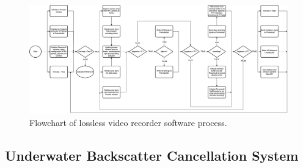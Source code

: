\pagebreak
\begin{landscape}
    \begin{figure}
        \centering
        \includegraphics[width=1\linewidth]{assets/impl_rec-flow.png}
        \caption{Flowchart of lossless video recorder software process.}
        \label{fig:recflow}
    \end{figure}
\end{landscape}
\pagebreak

\subsection{Underwater Backscatter Cancellation System}
\label{system_impl}

